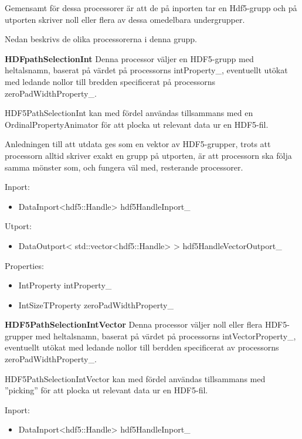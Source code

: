 \documentclass[10pt,oneside,swedish]{article}
\providecommand{\tightlist}{%
  \setlength{\itemsep}{0pt}\setlength{\parskip}{0pt}}
\begin{document}
Gemensamt för dessa processorer är att de på inporten tar en Hdf5-grupp
och på utporten skriver noll eller flera av dessa omedelbara
undergrupper.

Nedan beskrivs de olika processorerna i denna grupp.

\textbf{HDFpathSelectionInt} Denna processor väljer en HDF5-grupp med
heltalsnamn, baserat på värdet på processorns intProperty\_, eventuellt
utökat med ledande nollor till bredden specificerat på processorns
zeroPadWidthProperty\_.

HDF5PathSelectionInt kan med fördel användas tillsammans med en
OrdinalPropertyAnimator för att plocka ut relevant data ur en HDF5-fil.

Anledningen till att utdata ges som en vektor av HDF5-grupper, trots att
processorn alltid skriver exakt en grupp på utporten, är att processorn
ska följa samma mönster som, och fungera väl med, resterande
processorer.

Inport:

\begin{itemize}
\tightlist
\item
  DataInport\textless{}hdf5::Handle\textgreater{} hdf5HandleInport\_
\end{itemize}

Utport:

\begin{itemize}
\tightlist
\item
  DataOutport\textless{}
  std::vector\textless{}hdf5::Handle\textgreater{} \textgreater{}
  hdf5HandleVectorOutport\_
\end{itemize}

Properties:

\begin{itemize}
\tightlist
\item
  IntProperty intProperty\_
\item
  IntSizeTProperty zeroPadWidthProperty\_
\end{itemize}

\textbf{HDF5PathSelectionIntVector} Denna processor väljer noll eller
flera HDF5-grupper med heltalsnamn, baserat på värdet på processorns
intVectorProperty\_, eventuellt utökat med ledande nollor till berdden
specificerat av processorns zeroPadWidthProperty\_.

HDF5PathSelectionIntVector kan med fördel användas tillsammans med
''picking'' för att plocka ut relevant data ur en HDF5-fil.

Inport:

\begin{itemize}
\tightlist
\item
  DataInport\textless{}hdf5::Handle\textgreater{} hdf5HandleInport\_
\end{itemize}
\end{document}
